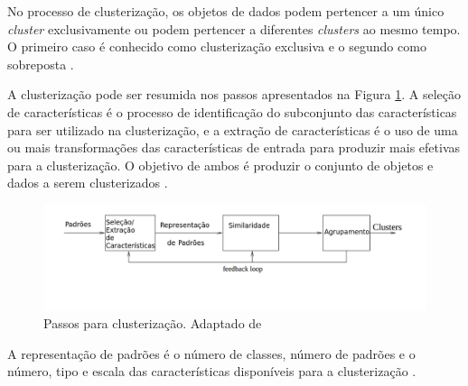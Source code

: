 No processo de clusterização, os objetos de dados podem pertencer a um único \textit{cluster} exclusivamente ou podem
pertencer a diferentes \textit{clusters} ao mesmo tempo. 
O primeiro caso é conhecido como clusterização exclusiva e o segundo como sobreposta \cite{tan2013data}. 
% 
% 
% 

A clusterização pode ser resumida nos passos apresentados na Figura \ref{fig:tasks_clustering}.
A seleção de características é o processo de identificação do subconjunto das características para ser utilizado na clusterização, 
e a extração de características é o uso de uma ou mais transformações das características de entrada para 
produzir mais efetivas para a clusterização. O objetivo de ambos é produzir o conjunto de objetos e dados a serem clusterizados \cite{clustering_review}.

\begin{figure}[h!]
\centering
\includegraphics[scale=0.6]{figuras/tasks_clustering.png}
\caption{Passos para clusterização. Adaptado de }
\label{fig:tasks_clustering}
\end{figure}

A representação de padrões é o número de classes, número de padrões e o número, tipo e escala
das características disponíveis para a clusterização \cite{clustering_review}.

